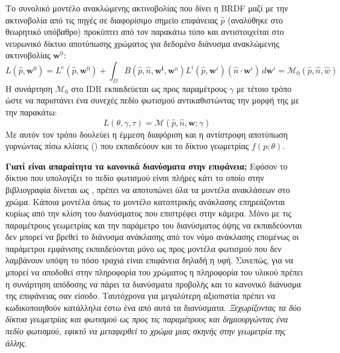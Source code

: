     Το συνολικό μοντέλο ανακλώμενης ακτινοβολίας που δίνει η BRDF μαζί με την ακτινοβολία από τις πηγές σε διαφορίσιμο σημείο επιφάνειας $\hat{p}$ (αναλύθηκε στο θεωρητικό υπόβαθρο) προκύπτει από τον παρακάτω τύπο και αντιστοιχείται στο νευρωνικό δίκτυο αποτύπωσης χρώματος  για δεδομένο διάνυσμα ανακλώμενης ακτινοβολίας $\boldsymbol{w}^0$:
    \begin{equation}
        L(\hat{p},\boldsymbol{w}^0) = L^{e}(\hat{p},\boldsymbol{w}^0) + \int_{\Omega}B(\hat{p},\hat{n},\boldsymbol{w^{i}},\boldsymbol{w}^{o})L^{i}(\hat{p},\boldsymbol{w}^{i})(\hat{n}\cdot \boldsymbol{w}^{i})\,d \boldsymbol{w}^{i} = \mathcal{M}_{0}(\hat{p},\hat{n},\hat{w})
        \label{eq:RenderingNetworkBRDF}
    \end{equation}
    Η συνάρτηση $\mathcal{M}_{0}$ στο IDR εκπαιδεύεται ως προς παραμέτρους $\gamma$ με τέτοιο τρόπο ώστε να παριστάνει ένα συνεχές πεδίο φωτισμού  αντικαθιστώντας την μορφή της με την παρακάτω: 
    \begin{equation}
        L(\theta,\gamma,\tau)=\mathcal{M}(\hat{p},\hat{n},\boldsymbol{w};\gamma)
        \label{eq:IDRLightField}
    \end{equation}
    Με αυτόν τον τρόπο δουλεύει η έμμεση διαφόριση και η αντίστροφη αποτύπωση γυρνώντας πίσω κλίσεις () που εκπαιδεύουν και το δίκτυο γεωμετρίας $f(p;\theta)$.
    
   

    \textbf{Γιατί είναι απαραίτητα τα κανονικά διανύσματα στην επιφάνεια;}
    Εφόσον το δίκτυο που υπολογίζει το πεδίο φωτισμού είναι πλήρες κάτι το οποίο στην βιβλιογραφία δίνεται ως , πρέπει να αποτυπώνει όλα τα μοντέλα ανακλάσεων στο χρώμα. Κάποια μοντέλα όπως το μοντέλο κατοπτρικής ανάκλασης επηρεάζονται κυρίως από την κλίση του διανύσματος που επιστρέφει στην κάμερα. Μόνο με τις παραμέτρους γεωμετρίας και την παράμετρο του διανύσματος όψης να εκπαιδεύονται δεν μπορεί να βρεθεί το διάνυσμα ανάκλασης από τον νόμο ανάκλασης επομένως οι παράμετροι εμφάνισης εκπαιδεύονται μόνο ως προς μοντέλα φωτισμού που δεν λαμβάνουν υπόψη το πόσο τραχιά είναι επιφάνεια δηλαδή η υφή. Συνεπώς, για να μπορεί να αποδοθεί στην πληροφορία του χρώματος η πληροφορία του υλικού πρέπει η συνάρτηση απόδοσης να πάρει τα διανύσματα προβολής και το κανονικό διάνυσμα της επιφάνειας σαν είσοδο. Ταυτόχρονα για μεγαλύτερη αξιοπιστία πρέπει να κωδικοποιηθούν κατάλληλα έστω ένα από αυτά τα διανύσματα.
     \emph{Ξεχωρίζοντας τα δύο δίκτυα γεωμετρίας και φωτισμού ως προς τις παραμέτρους και δημιουργώντας ένα  πεδίο φωτισμού, εφικτό να μεταφερθεί το χρώμα μιας σκηνής στην γεωμετρία της άλλης}.


